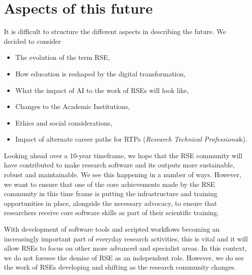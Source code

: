 \documentclass{eceasst}
\begin{document}
\section{Aspects of this future}
It is difficult to structure the different aspects in describing the future. We decided to consider
\begin{itemize}
\item The evolution of the term RSE,
\item How education is reshaped by the digital transformation,
\item What the impact of AI to the work of RSEs will look like,
\item Changes to the Academic Institutions,
\item Ethics and social considerations,
\item Impact of alternate career paths for RTPs (\emph{Research Technical Professional}s).
\end{itemize}


Looking ahead over a 10-year timeframe, we hope that the RSE community will have
contributed to make research software and its outputs
more sustainable, robust and maintainable. We see this happening in a number of ways. However,
we want to ensure that one of the core achievements made by the RSE community in this time
frame is putting the infrastructure and training opportunities in place, alongside the necessary
advocacy, to ensure that researchers receive core software skills as part of their scientific training.

With development of software tools and scripted workflows becoming an increasingly important part of everyday
research activities, this is vital and it will allow RSEs to focus on other more advanced and specialist
areas. In this context, we do not foresee the demise of RSE as an independent role. However, we
do see the work of RSEs developing and shifting as the research community changes.
\end{document}
